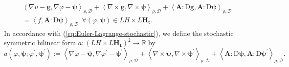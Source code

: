 \documentclass[final,onefignum,onetabnum]{mousaviart}
\begin{document}
	\begin{multline}
		\label{eq:Euler-Lagrange-stochastic}
		\left\langle \nabla u - \boldsymbol{g}, \nabla\varphi - \boldsymbol{\psi} \right\rangle_{\rho, \mathcal{D}}  
		+
		\left\langle  \nabla \times \boldsymbol{g}, \nabla \times \boldsymbol{\psi} \right\rangle_{\rho, \mathcal{D}} 
		+
		\left\langle  \boldsymbol{A} : \mathrm{D} \boldsymbol{g}, \boldsymbol{A} : \mathrm{D} \boldsymbol{\psi} \right\rangle_{\rho, \mathcal{D}} 
		\\
		= 
		\left\langle  f, \boldsymbol{A} : \mathrm{D} \boldsymbol{\psi} \right\rangle_{\rho, \mathcal{D}} 
		~~
		\forall (\varphi, \boldsymbol{\psi}) \in LH \times L\boldsymbol{H}_{\boldsymbol{t}}  .
	\end{multline}
	In accordance with (\ref{eq:Euler-Lagrange-stochastic}), we define the stochastic symmetric bilinear form $a: \left( LH \times L\boldsymbol{H}_{\boldsymbol{t}}  \right)^2  \rightarrow \mathbb{R}$ by
	\begin{equation}
		\label{def:stochastic-bilinear-a}
		a (\varphi, \boldsymbol{\psi}; \varphi^{\prime}, \boldsymbol{\psi}^{\prime}):=
		\left\langle \nabla\varphi - \boldsymbol{\psi} , \nabla\varphi^{\prime} - 	\boldsymbol{\psi}^{\prime}  \right\rangle_{\rho, \mathcal{D}}  
		+
		\left\langle  \nabla \times \boldsymbol{\psi}, \nabla \times 	\boldsymbol{\psi}^{\prime} \right\rangle_{\rho, \mathcal{D}} 
		+
		\left\langle  \boldsymbol{A} : \mathrm{D} \boldsymbol{\psi}, \boldsymbol{A} : \mathrm{D} 	\boldsymbol{\psi}^{\prime} \right\rangle_{\rho, \mathcal{D}}. 
	\end{equation}
	
\end{document}
